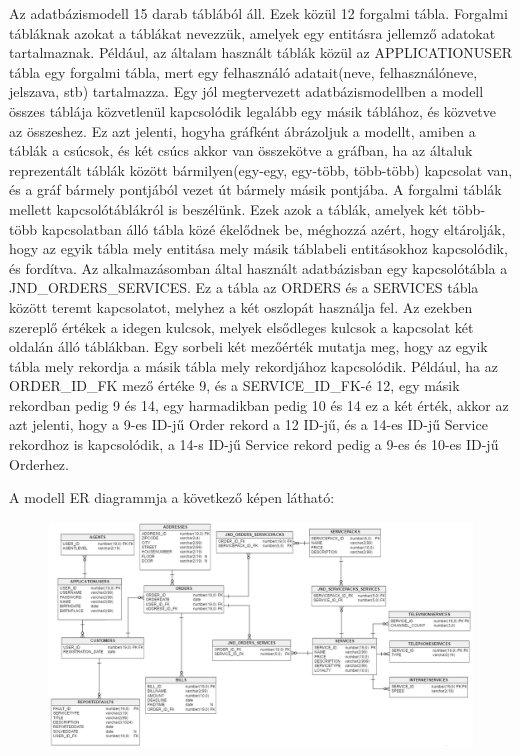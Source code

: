 \documentclass[centeredchapter]{thesis-ekf}
\theoremstyle{definition}
\theoremstyle{remark}
\begin{document}
Az adatbázismodell 15 darab táblából áll. Ezek közül 12 forgalmi tábla. Forgalmi tábláknak azokat a táblákat nevezzük, amelyek egy entitásra jellemző adatokat tartalmaznak. Például, az általam használt táblák közül az APPLICATIONUSER tábla egy forgalmi tábla, mert egy felhasználó adatait(neve, felhasználóneve, jelszava, stb) tartalmazza. Egy jól megtervezett adatbázismodellben a modell összes táblája közvetlenül kapcsolódik legalább egy másik táblához, és közvetve az összeshez. Ez azt jelenti, hogyha gráfként ábrázoljuk a modellt, amiben a táblák a csúcsok, és két csúcs akkor van összekötve a gráfban, ha az általuk reprezentált táblák között bármilyen(egy-egy, egy-több, több-több) kapcsolat van, és a gráf bármely pontjából vezet út bármely másik pontjába. A forgalmi táblák mellett kapcsolótáblákról is beszélünk. Ezek azok a táblák, amelyek két több-több kapcsolatban álló tábla közé ékelődnek be, méghozzá azért, hogy eltárolják, hogy az egyik tábla mely entitása mely másik táblabeli entitásokhoz kapcsolódik, és fordítva. Az alkalmazásomban által használt adatbázisban egy kapcsolótábla a JND\_ORDERS\_SERVICES. Ez a tábla az ORDERS és a SERVICES tábla között teremt kapcsolatot, melyhez a két oszlopát használja fel. Az ezekben szereplő értékek a idegen kulcsok, melyek elsődleges kulcsok a kapcsolat két oldalán álló táblákban. Egy sorbeli két mezőérték mutatja meg, hogy az egyik tábla mely rekordja a másik tábla mely rekordjához kapcsolódik. Például, ha az ORDER\_ID\_FK mező értéke 9, és a SERVICE\_ID\_FK-é 12, egy másik rekordban pedig 9 és 14, egy harmadikban pedig 10 és 14 ez a két érték, akkor az azt jelenti, hogy a 9-es ID-jű Order rekord a 12 ID-jű, és a 14-es ID-jű Service rekordhoz is kapcsolódik, a 14-s ID-jű Service rekord pedig a 9-es és 10-es ID-jű Orderhez.


A modell ER diagrammja a következő képen látható:

\begin{figure}[!h]
	\centering
	\includegraphics[width=14cm]{adatbazis-modell.png}
\end{figure}
\end{document}
